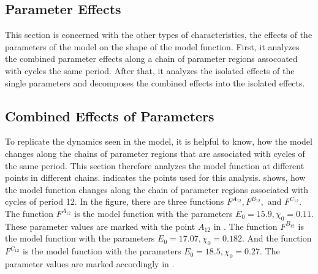 \subsection{Parameter Effects}
\label{sec:setup.char.paramfx}

This section is concerned with the other types of characteristics, the effects of the parameters of the model on the shape of the model function.
First, it analyzes the combined parameter effects along a chain of parameter regions assocoated with cycles the same period.
After that, it analyzes the isolated effects of the single parameters and decomposes the combined effects into the isolated effects.

\subsection{Combined Effects of Parameters}
\label{sec:setup.char.paramfx.combined}

To replicate the dynamics seen in the model, it is helpful to know, how the model changes along the chains of parameter regions that are associated with cycles of the same period.
This section therefore analyzes the model function at different points in different chains.
 indicates the points used for this analysis.
 shows, how the model function changes along the chain of parameter regions associated with cycles of period 12.
In the figure, there are three functions $F^{A_12}, F^{B_12},$ and $F^{C_12}$.
The function $F^{A_{12}}$ is the model function with the parameters $E_0 = 15.9, \chi_0 = 0.11$.
These parameter values are marked with the point $A_{12}$ in .
The function $F^{B_{12}}$ is the model function with the parameters $E_0 = 17.07, \chi_0 = 0.182$.
And the function $F^{C_{12}}$ is the model function with the parameters $E_0 = 18.5, \chi_0 = 0.27$.
The parameter values are marked accordingly in .

